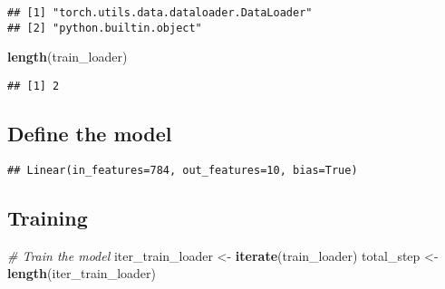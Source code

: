 \documentclass[]{book}
\newenvironment{Shaded}{\begin{snugshade}}{\end{snugshade}}
\newcommand{\CommentTok}[1]{\textcolor[rgb]{0.56,0.35,0.01}{\textit{#1}}}
\newcommand{\DataTypeTok}[1]{\textcolor[rgb]{0.13,0.29,0.53}{#1}}
\newcommand{\KeywordTok}[1]{\textcolor[rgb]{0.13,0.29,0.53}{\textbf{#1}}}
\newcommand{\NormalTok}[1]{#1}
\newcommand{\OperatorTok}[1]{\textcolor[rgb]{0.81,0.36,0.00}{\textbf{#1}}}
\newcommand{\StringTok}[1]{\textcolor[rgb]{0.31,0.60,0.02}{#1}}
\begin{document}
\begin{verbatim}
## [1] "torch.utils.data.dataloader.DataLoader"
## [2] "python.builtin.object"
\end{verbatim}

\begin{Shaded}
\begin{Highlighting}[]
\KeywordTok{length}\NormalTok{(train_loader)}
\end{Highlighting}
\end{Shaded}

\begin{verbatim}
## [1] 2
\end{verbatim}

\hypertarget{define-the-model}{%
\subsection{Define the model}\label{define-the-model}}

\begin{Shaded}
\end{Shaded}

\begin{verbatim}
## Linear(in_features=784, out_features=10, bias=True)
\end{verbatim}

\hypertarget{training-1}{%
\subsection{Training}\label{training-1}}

\begin{Shaded}
\begin{Highlighting}[]
\CommentTok{# Train the model}
\NormalTok{iter_train_loader <-}\StringTok{ }\KeywordTok{iterate}\NormalTok{(train_loader)}
\NormalTok{total_step <-}\KeywordTok{length}\NormalTok{(iter_train_loader)}
\end{Highlighting}
\end{Shaded}
\end{document}

